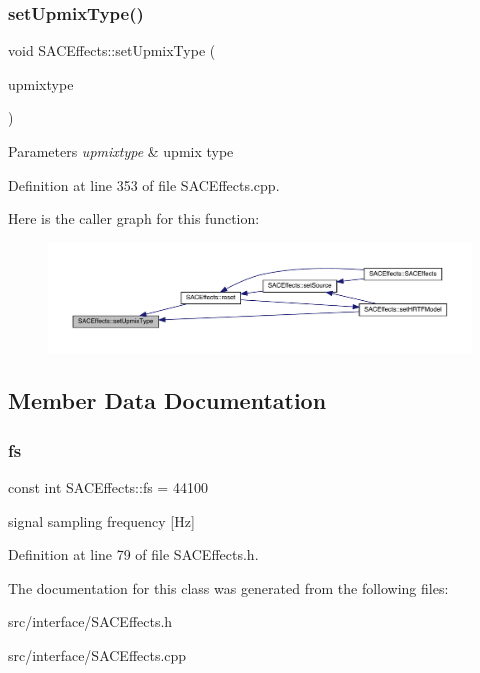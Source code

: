 \subsubsection{\texorpdfstring{set\+Upmix\+Type()}{setUpmixType()}}
{\footnotesize\ttfamily void S\+A\+C\+Effects\+::set\+Upmix\+Type (\begin{DoxyParamCaption}\item[{\hyperlink{struct_upmix_type_a6e154a570349b46c268b300b13d65daf}{Upmix\+Type\+::upmixtype}}]{upmixtype }\end{DoxyParamCaption})}


\begin{DoxyParams}{Parameters}
{\em upmixtype} & upmix type \\
\hline
\end{DoxyParams}


Definition at line 353 of file S\+A\+C\+Effects.\+cpp.

Here is the caller graph for this function\+:
\nopagebreak
\begin{figure}[H]
\begin{center}
\leavevmode
\includegraphics[width=350pt]{class_s_a_c_effects_afd3f1f8b005595d4adf06d67c2bd556c_icgraph}
\end{center}
\end{figure}


\subsection{Member Data Documentation}
\mbox{\label{class_s_a_c_effects_af9b20759f91e969aaa55f47f5aeecb37}} 
\subsubsection{\texorpdfstring{fs}{fs}}
{\footnotesize\ttfamily const int S\+A\+C\+Effects\+::fs = 44100}

signal sampling frequency \mbox{[}Hz\mbox{]} 

Definition at line 79 of file S\+A\+C\+Effects.\+h.



The documentation for this class was generated from the following files\+:\begin{DoxyCompactItemize}
\item 
src/interface/S\+A\+C\+Effects.\+h\item 
src/interface/S\+A\+C\+Effects.\+cpp\end{DoxyCompactItemize}

